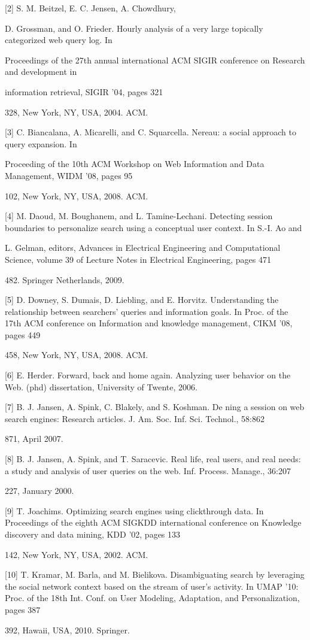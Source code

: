 \documentclass{acm_proc_article-sp} %
\begin{document}
{{[2]	S. M. Beitzel, E. C. Jensen, A. Chowdhury, 

D. Grossman, and O. Frieder. Hourly analysis of a very large topically categorized web query log. In 

Proceedings of the 27th annual international ACM SIGIR conference on Research and development in 
 
information retrieval, SIGIR '04, pages 321{328, New York, NY, USA, 2004. ACM.

[3]	C. Biancalana, A. Micarelli, and C. Squarcella. Nereau: a social approach to query expansion. In 

Proceeding of the 10th ACM Workshop on Web Information and Data Management, WIDM '08, pages 95{102, New York, NY, USA, 2008. ACM. 

[4]	M. Daoud, M. Boughanem, and L. Tamine-Lechani. Detecting session boundaries to personalize search using a conceptual user context. In S.-I. Ao and 

L. Gelman, editors, Advances in Electrical Engineering and Computational Science, volume 39 of Lecture Notes in Electrical Engineering, pages 471{482. Springer Netherlands, 2009. 

[5]	D. Downey, S. Dumais, D. Liebling, and E. Horvitz. Understanding the relationship between searchers' queries and information goals. In Proc. of the 17th ACM conference on Information and knowledge management, CIKM '08, pages 449{458, New York, NY, USA, 2008. ACM. 

[6]	E. Herder. Forward, back and home again. Analyzing user behavior on the Web. (phd) dissertation, University of Twente, 2006. 

[7]	B. J. Jansen, A. Spink, C. Blakely, and S. Koshman. De ning a session on web search engines: Research articles. J. Am. Soc. Inf. Sci. Technol., 58:862{871, April 2007. 

[8]	B. J. Jansen, A. Spink, and T. Saracevic. Real life, real users, and real needs: a study and analysis of user queries on the web. Inf. Process. Manage., 36:207{227, January 2000. 

[9]	T. Joachims. Optimizing search engines using clickthrough data. In Proceedings of the eighth ACM SIGKDD international conference on Knowledge discovery and data mining, KDD '02, pages 133{142, New York, NY, USA, 2002. ACM. 

[10]	T. Kramar, M. Barla, and M. Bielikova. Disambiguating search by leveraging the social network context based on the stream of user's activity. In UMAP '10: Proc. of the 18th Int. Conf. on User Modeling, Adaptation, and Personalization, pages 387{392, Hawaii, USA, 2010. Springer. 

}}}}}}}}}}
\end{document}
